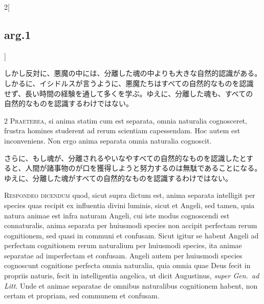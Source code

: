 \documentclass[paper=a4paper,fontsize=10pt,jafontsize=9pt,titlepage]{jlreq}
\begin{document}
\begin{paracol}{2}[\subsection{arg.1}]
\switchcolumn

しかし反対に、悪魔の中には、分離した魂の中よりも大きな自然的認識がある。
しかるに、イシドルスが言うように、悪魔たちはすべての自然的なものを認識
せず、長い時間の経験を通して多くを学ぶ。ゆえに、分離した魂も、すべての
自然的なものを認識するわけではない。

\switchcolumn*

2 {\scshape Praeterea}, si anima statim cum est separata, omnia naturalia
cognosceret, frustra homines studerent ad rerum scientiam capessendam.
Hoc autem est inconveniens. Non ergo anima separata omnia naturalia
cognoscit.

\switchcolumn

さらに、もし魂が、分離されるやいなやすべての自然的なものを認識したとす
ると、人間が諸事物のが口を獲得しようと努力するのは無駄であることになる。
ゆえに、分離した魂がすべての自然的なものを認識するわけではない。


{\scshape Respondeo dicendum} quod, sicut supra dictum est, anima separata
intelligit per species quas recipit ex influentia divini luminis,
sicut et Angeli, sed tamen, quia natura animae est infra naturam
Angeli, cui iste modus cognoscendi est connaturalis, anima separata
per huiusmodi species non accipit perfectam rerum cognitionem, sed
quasi in communi et confusam. Sicut igitur se habent Angeli ad
perfectam cognitionem rerum naturalium per huiusmodi species, ita
animae separatae ad imperfectam et confusam. Angeli autem per
huiusmodi species cognoscunt cognitione perfecta omnia naturalia, quia
omnia quae Deus fecit in propriis naturis, fecit in intelligentia
angelica, ut dicit Augustinus, {\itshape super Gen.~ad Litt}. Unde et
animae separatae de omnibus naturalibus cognitionem habent, non certam
et propriam, sed communem et confusam.


\end{paracol}
\end{document}
